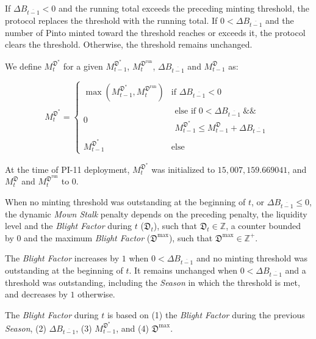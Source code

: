 \documentclass[tikz]{article}
\makeatletter
\newenvironment{keepunit}{%
  \par\penalty0\begingroup
  \edef\keepunitparskip{\the\parskip}%
  \noindent\begin{minipage}[t]{\linewidth}%
  \setlength{\parskip}{\keepunitparskip}%
  \@minipagefalse
}{%
  \end{minipage}\par\endgroup
}
\newcommand{\term}[1]{\textsl{#1}}
\makeatother
\begin{document}
If \(\Delta B_{\overline{t-1}}<0\) and the running total exceeds the preceding minting threshold, the protocol replaces the threshold with the running total. If \(0<\Delta B_{\overline{t-1}}\) and the number of Pinto minted toward the threshold reaches or exceeds it, the protocol clears the threshold. Otherwise, the threshold remains unchanged.

\begin{keepunit}
We define $M_t^{\mathfrak{D}^{*}}$ for a given $M_{t-1}^{\mathfrak{D}^{*}}$, $M_t^{\mathfrak{D}^{\text{run}}}$, $\Delta B_{\overline{t-1}}$ and $M_{t-1}^{\mathfrak{D}}$ as:

    $$
        M_t^{\mathfrak{D}^{*}} =
        \begin{cases}
            \max\left(M_{t-1}^{\mathfrak{D}^{*}},M_t^{\mathfrak{D}^{\text{run}}}\right) & \text{if }\Delta B_{\overline{t-1}}<0\\[2mm]
            0 & \begin{gathered}\text{else if }0<\Delta B_{\overline{t-1}}\ \&\&\\M_{t-1}^{\mathfrak{D}^{*}}\leq M_{t-1}^{\mathfrak{D}}+\Delta B_{\overline{t-1}}\end{gathered}\\[2mm]
            M_{t-1}^{\mathfrak{D}^{*}} & \text{else}
        \end{cases}
    $$
\end{keepunit}

At the time of PI-11 deployment, $M_t^{\mathfrak{D}^{*}}$ was initialized to $15,007,159.669041$, and $M_t^{\mathfrak{D}}$ and $M_t^{\mathfrak{D}^{\text{run}}}$ to $0$.

When no minting threshold was outstanding at the beginning of $t$, or $\Delta B_{\overline{t-1}}\leq0$, the dynamic \term{Mown Stalk} penalty depends on the preceding penalty, the liquidity level and the \term{Blight Factor} during $t$ ($\mathfrak{D}_{t}$), such that $\mathfrak{D}_{t} \in \mathbb{Z}$, a counter bounded by $0$ and the maximum \term{Blight Factor} ($\mathfrak{D}^{\text{max}}$), such that $\mathfrak{D}^{\text{max}} \in \mathbb{Z}^{+}$.

The \term{Blight Factor} increases by $1$ when $0<\Delta B_{\overline{t-1}}$ and no minting threshold was outstanding at the beginning of $t$. It remains unchanged when $0<\Delta B_{\overline{t-1}}$ and a threshold was outstanding, including the \term{Season} in which the threshold is met, and decreases by $1$ otherwise.

The \term{Blight Factor} during $t$ is based on (1) the \term{Blight Factor} during the previous \term{Season}, (2) $\Delta B_{\overline{t-1}}$, (3) $M_{t-1}^{\mathfrak{D}^{*}}$, and (4) $\mathfrak{D}^{\text{max}}$.
\end{document}

